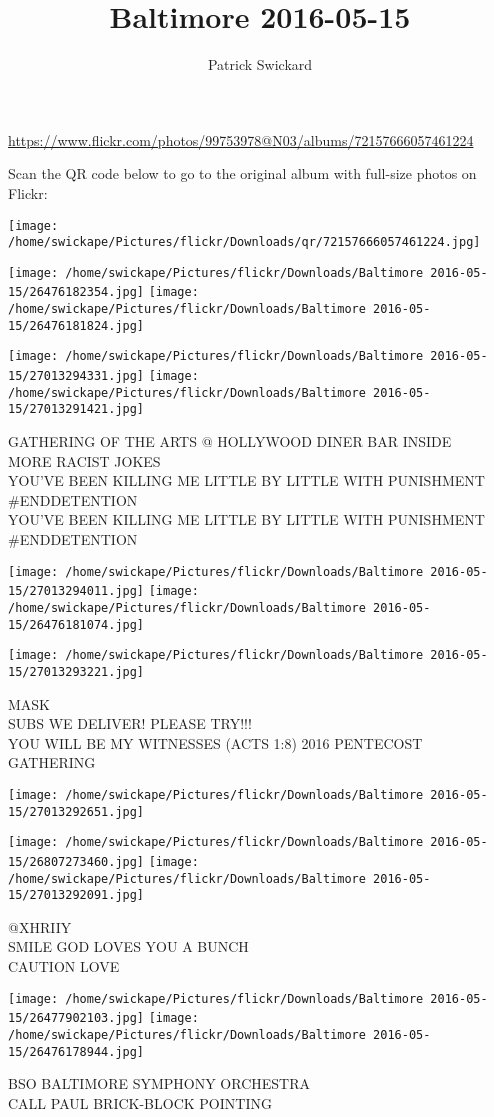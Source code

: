 \documentclass[10pt,letterpaper]{article}
\title{Baltimore 2016-05-15}
\author{Patrick Swickard}
\date{}
\begin{document}
\maketitle

\url{https://www.flickr.com/photos/99753978@N03/albums/72157666057461224}

Scan the QR code below to go to the original album with full-size photos on Flickr:

\texttt{[image: /home/swickape/Pictures/flickr/Downloads/qr/72157666057461224.jpg]}
\pagebreak

\texttt{[image: /home/swickape/Pictures/flickr/Downloads/Baltimore 2016-05-15/26476182354.jpg]}
\texttt{[image: /home/swickape/Pictures/flickr/Downloads/Baltimore 2016-05-15/26476181824.jpg]}

\texttt{[image: /home/swickape/Pictures/flickr/Downloads/Baltimore 2016-05-15/27013294331.jpg]}
\texttt{[image: /home/swickape/Pictures/flickr/Downloads/Baltimore 2016-05-15/27013291421.jpg]}

GATHERING OF THE ARTS @ HOLLYWOOD DINER BAR INSIDE\\
MORE RACIST JOKES\\
YOU'VE BEEN KILLING ME LITTLE BY LITTLE WITH PUNISHMENT \#ENDDETENTION\\
YOU'VE BEEN KILLING ME LITTLE BY LITTLE WITH PUNISHMENT \#ENDDETENTION
\pagebreak

\texttt{[image: /home/swickape/Pictures/flickr/Downloads/Baltimore 2016-05-15/27013294011.jpg]}
\texttt{[image: /home/swickape/Pictures/flickr/Downloads/Baltimore 2016-05-15/26476181074.jpg]}

\texttt{[image: /home/swickape/Pictures/flickr/Downloads/Baltimore 2016-05-15/27013293221.jpg]}

MASK\\
SUBS WE DELIVER!  PLEASE TRY!!!\\
YOU WILL BE MY WITNESSES (ACTS 1:8) 2016 PENTECOST GATHERING
\pagebreak

\texttt{[image: /home/swickape/Pictures/flickr/Downloads/Baltimore 2016-05-15/27013292651.jpg]}

\vspace{0.25in}
\texttt{[image: /home/swickape/Pictures/flickr/Downloads/Baltimore 2016-05-15/26807273460.jpg]}
\texttt{[image: /home/swickape/Pictures/flickr/Downloads/Baltimore 2016-05-15/27013292091.jpg]}

@XHRIIY\\
SMILE GOD LOVES YOU A BUNCH\\
CAUTION LOVE
\pagebreak

\texttt{[image: /home/swickape/Pictures/flickr/Downloads/Baltimore 2016-05-15/26477902103.jpg]}
\texttt{[image: /home/swickape/Pictures/flickr/Downloads/Baltimore 2016-05-15/26476178944.jpg]}

BSO BALTIMORE SYMPHONY ORCHESTRA\\
CALL PAUL BRICK{-}BLOCK POINTING
\pagebreak
\end{document}
